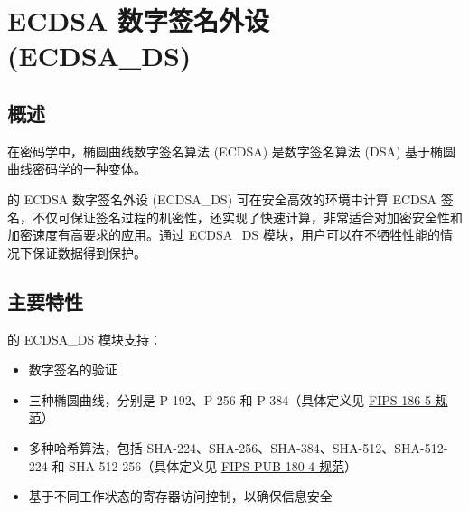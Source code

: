 \documentclass[main\_\_CN.tex]{subfiles}
\begin{document}

\ifglobal
\else
    {\let\clearpage\relax \listoftodos}
    {\let\clearpage\relax \listofdonetodos}
    \tableofcontents
\fi



\hypertarget{ecdsa}{}
\chapter{ECDSA 数字签名外设 (ECDSA\_DS)}
\label{mod:ecdsa}



\section{概述}

在密码学中，椭圆曲线数字签名算法 (ECDSA) 是数字签名算法 (DSA) 基于椭圆曲线密码学的一种变体。

\chipname{} 的 ECDSA 数字签名外设 (ECDSA\_DS) 可在安全高效的环境中计算 ECDSA 签名，不仅可保证签名过程的机密性，还实现了快速计算，非常适合对加密安全性和加密速度有高要求的应用。通过 ECDSA\_DS 模块，用户可以在不牺牲性能的情况下保证数据得到保护。



\section{主要特性}
\label{sec:ecdsa-features}

\chipname{} 的 ECDSA\_DS 模块支持：

\begin{itemize}
    \item 数字签名的验证
    \item 三种椭圆曲线，分别是 P-192、P-256 和 P-384（具体定义见 \href{https://nvlpubs.nist.gov/nistpubs/FIPS/NIST.FIPS.186-5.pdf}{FIPS 186-5 规范}）
    \item 多种哈希算法，包括 SHA-224、SHA-256、SHA-384、SHA-512、SHA-512-224 和 SHA-512-256（具体定义见 \href{https://doi.org/10.6028/NIST.FIPS.180-4}{FIPS PUB 180-4 规范}）
    \item 基于不同工作状态的寄存器访问控制，以确保信息安全
\end{itemize}
\end{document}
